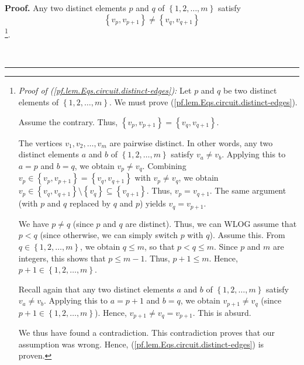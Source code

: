 \documentclass[numbers=enddot,12pt,final,onecolumn,notitlepage]{scrartcl}%
\theoremstyle{definition}
\newenvironment{proof}[1][Proof]{\noindent\textbf{#1.} }{\ \rule{0.5em}{0.5em}}
\newenvironment{verlong}{}{}
\begin{document}
\begin{verlong}
\begin{proof}
Any two distinct elements $p$ and $q$ of $\left\{  1,2,\ldots,m\right\}  $
satisfy%
\begin{equation}
\left\{  v_{p},v_{p+1}\right\}  \neq\left\{  v_{q},v_{q+1}\right\}
\label{pf.lem.Eqs.circuit.distinct-edges}%
\end{equation}
\footnote{\textit{Proof of (\ref{pf.lem.Eqs.circuit.distinct-edges}):} Let $p$
and $q$ be two distinct elements of $\left\{  1,2,\ldots,m\right\}  $. We must
prove (\ref{pf.lem.Eqs.circuit.distinct-edges}).
\par
Assume the contrary. Thus, $\left\{  v_{p},v_{p+1}\right\}  =\left\{
v_{q},v_{q+1}\right\}  $.
\par
The vertices $v_{1},v_{2},\ldots,v_{m}$ are pairwise distinct. In other words,
any two distinct elements $a$ and $b$ of $\left\{  1,2,\ldots,m\right\}  $
satisfy $v_{a}\neq v_{b}$. Applying this to $a=p$ and $b=q$, we obtain
$v_{p}\neq v_{q}$. Combining $v_{p}\in\left\{  v_{p},v_{p+1}\right\}
=\left\{  v_{q},v_{q+1}\right\}  $ with $v_{p}\neq v_{q}$, we obtain $v_{p}%
\in\left\{  v_{q},v_{q+1}\right\}  \setminus\left\{  v_{q}\right\}
\subseteq\left\{  v_{q+1}\right\}  $. Thus, $v_{p}=v_{q+1}$. The same argument
(with $p$ and $q$ replaced by $q$ and $p$) yields $v_{q}=v_{p+1}$.
\par
We have $p\neq q$ (since $p$ and $q$ are distinct). Thus, we can WLOG assume
that $p<q$ (since otherwise, we can simply switch $p$ with $q$). Assume this.
From $q\in\left\{  1,2,\ldots,m\right\}  $, we obtain $q\leq m$, so that
$p<q\leq m$. Since $p$ and $m$ are integers, this shows that $p\leq m-1$.
Thus, $p+1\leq m$. Hence, $p+1\in\left\{  1,2,\ldots,m\right\}  $.
\par
Recall again that any two distinct elements $a$ and $b$ of $\left\{
1,2,\ldots,m\right\}  $ satisfy $v_{a}\neq v_{b}$. Applying this to $a=p+1$
and $b=q$, we obtain $v_{p+1}\neq v_{q}$ (since $p+1\in\left\{  1,2,\ldots
,m\right\}  $). Hence, $v_{p+1}\neq v_{q}=v_{p+1}$. This is absurd.
\par
We thus have found a contradiction. This contradiction proves that our
assumption was wrong. Hence, (\ref{pf.lem.Eqs.circuit.distinct-edges}) is
proven.}.


\end{proof}
\end{verlong}
\end{document}

